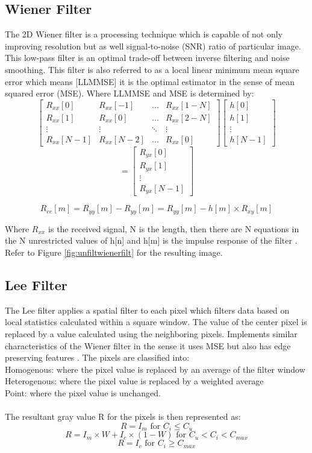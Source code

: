\documentclass[%
reprint,
showpacs,preprintnumbers,
bibnotes,
amsmath,amssymb,
aps,
pra,
]{revtex4-1}
\begin{document}
	\subsection{\label{sec:level2} Wiener Filter}
	The 2D Wiener filter is a processing technique which is capable of not only improving resolution but as well signal-to-noise (SNR) ratio of particular image. This low-pass filter is an optimal trade-off between inverse filtering and noise smoothing. This filter is also referred to as a local linear minimum mean square error which means [LLMMSE] it is the optimal estimator in the sense of mean squared error (MSE). Where LLMMSE and MSE is determined by:
$$
\begin{bmatrix}
R_{xx}[0] & R_{xx}[-1] & ... & R_{xx}[1-N]\\
R_{xx}[1] & R_{xx}[0] & ... & R_{xx}[2-N]\\
\vdots & \vdots & \ddots & \vdots \\
R_{xx}[N-1] & R_{xx}[N-2] & ... & R_{xx}[0]
\end{bmatrix}
\begin{bmatrix}
h[0]\\
h[1]\\
\vdots\\
h[N-1]
\end{bmatrix}
$$
$$
=
\begin{bmatrix}
R_{yx}[0]\\
R_{yx}[1]\\
\vdots\\
R_{yx}[N-1]
\end{bmatrix}
$$

$$R_{ee}[m]=R_{yy}[m]-R_{yy}[m] = R_{yy}[m]-h[m] \times R_{xy}[m]$$

Where $R_{xx}$ is the received signal, N is the length, then there are N equations in the N unrestricted values of h[n] and h[m] is the impulse response of the filter \cite{Oppenheim_2015}. Refer to Figure \ref{fig:unfiltwienerfilt} for the resulting image.


\subsection{\label{sec:level2} Lee Filter}
The Lee filter applies a spatial filter to each pixel which filters data based on local statistics calculated within a square window. The value of the center pixel is replaced by a value calculated using the neighboring pixels. Implements similar characteristics of the Wiener filter in the sense it uses MSE but also has edge preserving features \cite{leefilter}. The pixels are classified into:
\\
Homogenous: where the pixel value is replaced by an average of the filter window
\\
Heterogenous: where the pixel value is replaced by a weighted average
\\
Point: where the pixel value is unchanged.
\\
\\
The resultant gray value R for the pixels is then represented as:
$$R = I_{m} \text{ for } C_{i} \leq C_{u}$$
$$R = I_{m} \times W+I_{c} \times (1-W) \text{ for } C_{u}<C_{i}<C_{max}$$
$$R = I_{c} \text{ for } C_{i} \geq C_{max}$$
\end{document}
